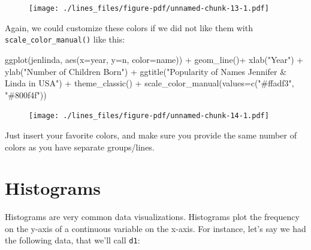 \documentclass[
  letterpaper,
  DIV=11,
  numbers=noendperiod]{scrreprt}
\newenvironment{Shaded}{\begin{snugshade}}{\end{snugshade}}
\newcommand{\AttributeTok}[1]{\textcolor[rgb]{0.40,0.45,0.13}{#1}}
\newcommand{\FunctionTok}[1]{\textcolor[rgb]{0.28,0.35,0.67}{#1}}
\newcommand{\NormalTok}[1]{\textcolor[rgb]{0.00,0.23,0.31}{#1}}
\newcommand{\SpecialCharTok}[1]{\textcolor[rgb]{0.37,0.37,0.37}{#1}}
\newcommand{\StringTok}[1]{\textcolor[rgb]{0.13,0.47,0.30}{#1}}
\begin{document}
\begin{figure}[H]

{\centering \texttt{[image: ./lines\_files/figure-pdf/unnamed-chunk-13-1.pdf]}

}

\end{figure}

Again, we could customize these colors if we did not like them with
\texttt{scale\_color\_manual()} like this:

\begin{Shaded}
\begin{Highlighting}[]
\FunctionTok{ggplot}\NormalTok{(jenlinda, }\FunctionTok{aes}\NormalTok{(}\AttributeTok{x=}\NormalTok{year, }\AttributeTok{y=}\NormalTok{n, }\AttributeTok{color=}\NormalTok{name)) }\SpecialCharTok{+} 
  \FunctionTok{geom\_line}\NormalTok{()}\SpecialCharTok{+}
  \FunctionTok{xlab}\NormalTok{(}\StringTok{"Year"}\NormalTok{) }\SpecialCharTok{+}
  \FunctionTok{ylab}\NormalTok{(}\StringTok{"Number of Children Born"}\NormalTok{) }\SpecialCharTok{+}
  \FunctionTok{ggtitle}\NormalTok{(}\StringTok{"Popularity of Names Jennifer \& Linda in USA"}\NormalTok{) }\SpecialCharTok{+}
  \FunctionTok{theme\_classic}\NormalTok{() }\SpecialCharTok{+}
  \FunctionTok{scale\_color\_manual}\NormalTok{(}\AttributeTok{values=}\FunctionTok{c}\NormalTok{(}\StringTok{"\#ffadf3"}\NormalTok{, }\StringTok{"\#800f4f"}\NormalTok{))}
\end{Highlighting}
\end{Shaded}

\begin{figure}[H]

{\centering \texttt{[image: ./lines\_files/figure-pdf/unnamed-chunk-14-1.pdf]}

}

\end{figure}

Just insert your favorite colors, and make sure you provide the same
number of colors as you have separate groups/lines.


\hypertarget{histograms}{%
\chapter{Histograms}\label{histograms}}

Histograms are very common data visualizations. Histograms plot the
frequency on the y-axis of a continuous variable on the x-axis. For
instance, let's say we had the following data, that we'll call
\texttt{d1}:
\end{document}
